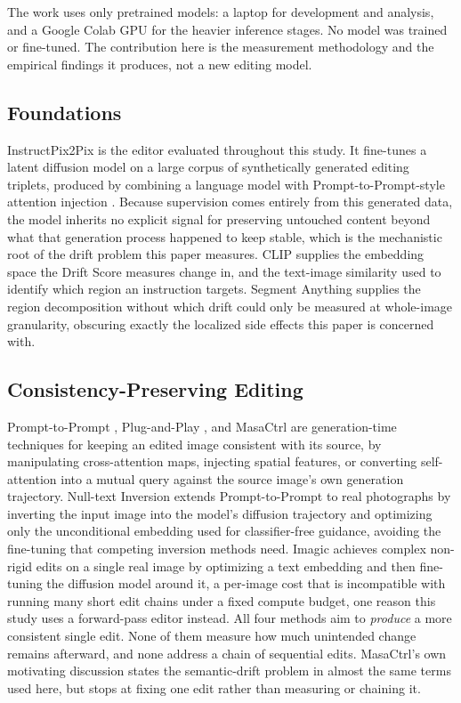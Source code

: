 The work uses only pretrained models: a laptop for development and analysis, and a Google Colab GPU for the heavier inference stages. No model was trained or fine-tuned. The contribution here is the measurement methodology and the empirical findings it produces, not a new editing model.

\subsection{Foundations}
InstructPix2Pix \cite{ref_ip2p} is the editor evaluated throughout this study. It fine-tunes a latent diffusion model \cite{ref_ldm} on a large corpus of synthetically generated editing triplets, produced by combining a language model with Prompt-to-Prompt-style attention injection \cite{ref_p2p}. Because supervision comes entirely from this generated data, the model inherits no explicit signal for preserving untouched content beyond what that generation process happened to keep stable, which is the mechanistic root of the drift problem this paper measures. CLIP \cite{ref_clip} supplies the embedding space the Drift Score measures change in, and the text-image similarity used to identify which region an instruction targets. Segment Anything \cite{ref_sam} supplies the region decomposition without which drift could only be measured at whole-image granularity, obscuring exactly the localized side effects this paper is concerned with.

\subsection{Consistency-Preserving Editing}
Prompt-to-Prompt \cite{ref_p2p}, Plug-and-Play \cite{ref_pnp}, and MasaCtrl \cite{ref_masactrl} are generation-time techniques for keeping an edited image consistent with its source, by manipulating cross-attention maps, injecting spatial features, or converting self-attention into a mutual query against the source image's own generation trajectory. Null-text Inversion \cite{ref_nti} extends Prompt-to-Prompt to real photographs by inverting the input image into the model's diffusion trajectory and optimizing only the unconditional embedding used for classifier-free guidance, avoiding the fine-tuning that competing inversion methods need. Imagic \cite{ref_imagic} achieves complex non-rigid edits on a single real image by optimizing a text embedding and then fine-tuning the diffusion model around it, a per-image cost that is incompatible with running many short edit chains under a fixed compute budget, one reason this study uses a forward-pass editor instead. All four methods aim to \textit{produce} a more consistent single edit. None of them measure how much unintended change remains afterward, and none address a chain of sequential edits. MasaCtrl's own motivating discussion states the semantic-drift problem in almost the same terms used here, but stops at fixing one edit rather than measuring or chaining it.

